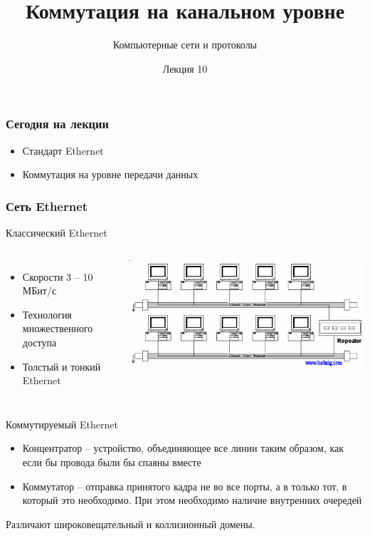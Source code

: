 \documentclass[utf8]{beamer}
\title{Коммутация на канальном уровне}
\author {Компьютерные сети и протоколы}
\date{Лекция 10}
\begin{document}
\begin{frame}
\titlepage
\end{frame}
\begin{frame}
\frametitle{Сегодня на лекции}
\begin{itemize}
\item Стандарт Ethernet
\item Коммутация на уровне передачи данных
\end{itemize}
\end{frame}
\begin{frame}
\frametitle{Сеть Ethernet}
\begin{block}{Классический Ethernet}
\begin{columns}
\begin{itemize}
 \item Скорости 3 -- 10 МБит/с
 \item Технология множественного доступа
 \item Толстый и тонкий Ethernet
\end{itemize}
\begin{center}
\includegraphics[width=\textwidth]{pic/ethernet-coaxial.png}
\end{center}
\end{columns}
\end{block}

\begin{block}{Коммутируемый Ethernet}
\begin{itemize}
 \item Концентратор -- устройство, объединяющее все линии таким образом, как если бы провода были бы спаяны вместе
 \item Коммутатор -- отправка принятого кадра не во все порты, а в только тот, в который это необходимо. При этом необходимо наличие внутренних очередей
\end{itemize}
Различают широковещательный и коллизионный домены.
\end{block}
\end{frame}
\end{document}
